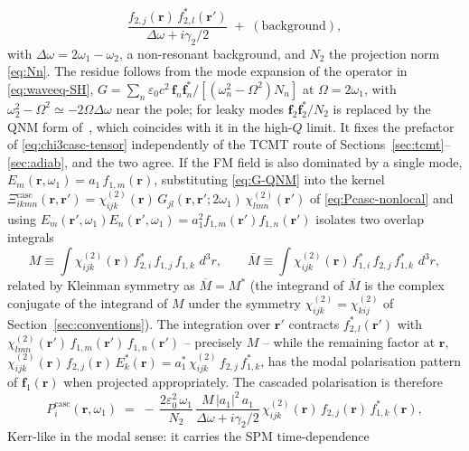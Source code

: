 \documentclass[11pt,a4paper]{article}
\newcommand{\eps}{\varepsilon}
\newcommand{\bvec}[1]{\mathbf{#1}}
\newcommand{\f}{\bvec{f}}
\newcommand{\ri}{\bvec{r}}
\newcommand{\dthreer}{\,d^{3}r}
\newcommand{\chitwo}{\chi^{(2)}}
\newcommand{\Dom}{\Delta\omega}
\begin{document}
\begin{itemize}
\begin{equation}
      \frac{f_{2,j}(\ri)\,f_{2,l}^*(\ri')}{\Dom+i\gamma_2/2}
      \;+\;(\text{background}),
    \label{eq:G-QNM}
    \end{equation}
    with $\Dom=2\omega_1-\omega_2$, a non-resonant background, and $N_2$
    the projection norm \eqref{eq:Nn}.  The residue follows
    from the mode expansion of the operator in \eqref{eq:waveeq-SH},
    $G=\sum_n\eps_0c^2\,\f_n\f_n^*/[(\omega_n^2-\Omega^2)N_n]$ at
    $\Omega=2\omega_1$, with $\omega_2^2-\Omega^2\simeq-2\Omega\Dom$ near
    the pole; for leaky modes $\f_2\f_2^*/N_2$ is replaced by the QNM
    form of~\cite[Eq.~(31)]{Sauvan2013}, which coincides with it in the
    high-$Q$ limit.  It fixes the prefactor of
    \eqref{eq:chi3casc-tensor} independently of the TCMT route of
    Sections~\ref{sec:tcmt}--\ref{sec:adiab}, and the two agree.
    If the FM field is also dominated by a single mode,
    $E_m(\ri,\omega_1)=a_1\,f_{1,m}(\ri)$, substituting \eqref{eq:G-QNM}
    into the kernel
    $\Xi^{\text{casc}}_{ikmn}(\ri,\ri')=\chitwo_{ijk}(\ri)\,G_{jl}(\ri,\ri';2\omega_1)\,\chitwo_{lmn}(\ri')$
    of \eqref{eq:Pcasc-nonlocal} and using
    $E_m(\ri',\omega_1)E_n(\ri',\omega_1)=a_1^{2}f_{1,m}(\ri')f_{1,n}(\ri')$
    isolates two overlap integrals
    \begin{equation}
      M\equiv \!\int\!\chitwo_{ijk}(\ri)\,f_{2,i}^*\,f_{1,j}\,f_{1,k}\,\dthreer,
      \qquad
      \overline M\equiv \!\int\!\chitwo_{ijk}(\ri)\,f_{1,i}^*\,f_{2,j}\,f_{1,k}^*\,\dthreer,
      \label{eq:M-overline-M}
    \end{equation}
    related by Kleinman symmetry as $\overline M=M^*$ (the integrand
    of $\overline M$ is the complex conjugate of the integrand of $M$
    under the symmetry $\chitwo_{ijk}=\chitwo_{kij}$ of
    Section~\ref{sec:conventions}).  The integration over $\ri'$
    contracts $f_{2,l}^*(\ri')$ with $\chitwo_{lmn}(\ri')\,f_{1,m}(\ri')\,f_{1,n}(\ri')$
    -- precisely $M$ -- while the remaining factor at $\ri$,
    $\chitwo_{ijk}(\ri)\,f_{2,j}(\ri)\,E_k^*(\ri)=a_1^*\,\chitwo_{ijk}\,f_{2,j}\,f_{1,k}^*$,
    has the modal polarisation pattern of $\f_1(\ri)$ when projected
    appropriately.  The cascaded polarisation is therefore
    \begin{equation}
      P_i^{\text{casc}}(\ri,\omega_1)\;=\;
        -\,\frac{2\eps_0^2\,\omega_1}{N_2}\,
        \frac{M\,|a_1|^{2}\,a_1}{\Dom+i\gamma_2/2}\,
        \chitwo_{ijk}(\ri)\,f_{2,j}(\ri)\,f_{1,k}^{*}(\ri),
      \label{eq:Pcasc-modal}
    \end{equation}
    Kerr-like in the modal sense: it carries the SPM time-dependence

\end{itemize}
\end{document}
